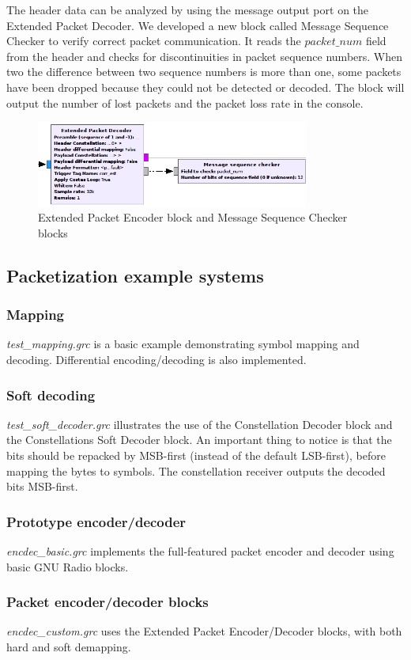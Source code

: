 The header data can be analyzed by using the message output port on the Extended Packet Decoder. We developed a new block called Message Sequence Checker  to verify correct packet communication. It reads the $packet\_num$ field from the header and checks for discontinuities in packet sequence numbers. When two the difference between two sequence numbers is more than one, some packets have been dropped because they could not be detected or decoded. The block will output the number of lost packets and the packet loss rate in the console.


\begin{figure}[H]
    \centering
    \includegraphics[width=0.8\textwidth]{img_packets/packet_dec_block.png}
    \caption{Extended Packet Encoder block and Message Sequence Checker blocks}
    \label{fig:packet_dec_block}
\end{figure}


\subsection{Packetization example systems}

\subsubsection*{Mapping}
\textit{test\_mapping.grc} is a basic example demonstrating symbol mapping and decoding. Differential encoding/decoding is also implemented.

\subsubsection*{Soft decoding}
\textit{test\_soft\_decoder.grc} illustrates the use of the {Constellation Decoder} block and the {Constellations Soft Decoder} block. An important thing to notice is that the bits should be repacked by MSB-first (instead of the default LSB-first), before mapping the bytes to symbols. The constellation receiver outputs the decoded bits MSB-first.

\subsubsection*{Prototype encoder/decoder}
\textit{encdec\_basic.grc} implements the full-featured packet encoder and decoder using basic GNU Radio blocks. \medskip

\subsubsection*{Packet encoder/decoder blocks }
\textit{encdec\_custom.grc} uses the Extended Packet Encoder/Decoder blocks, with both hard and soft demapping. \medskip